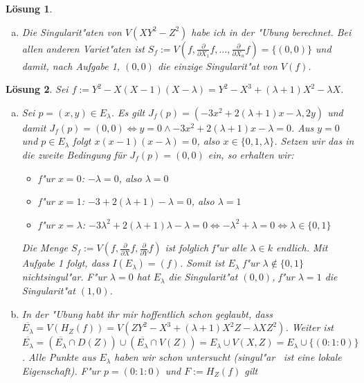 \documentclass[a4paper, 12pt, numbers=noendperiod, chapterprefix=true]{scrbook}
\theoremstyle{break}
\newtheorem{Loes}{L\"osung}
\theoremstyle{nonumberbreak}
\theoremstyle{nonumberplain}
\newcommand{\quot}[1]{\textrm{\glqq}{#1}\textrm{\grqq}}
\newcommand{\pder}[2][]{\frac{\partial #1}{\partial #2}}  %
\begin{document}
\begin{Loes}\begin{enumerate}[a)]\item
Die Singularit"aten von $V(XY^2 - Z^2)$ habe ich in der "Ubung berechnet. Bei allen anderen Variet"aten ist $S_f := V(f, \pder{X_1}{f}, \dots, \pder{X_n}{f}) = \{(0,0)\}$ und damit, nach Aufgabe 1, $(0,0)$ die einzige Singularit"at von $V(f)$.
\end{enumerate}\end{Loes}

\setcounter{Loes}{3}

\begin{Loes}
Sei $f:= Y^2 - X(X-1)(X-\lambda) = Y^2- X^3+(\lambda+1)X^2 - \lambda X$.\begin{enumerate}[a)]
\item
	Sei $p=(x,y) \in E_ {\lambda}$. Es gilt $J_f(p) = (-3x^2+2(\lambda+1)x-\lambda, 2y)$ und damit $J_f(p) = (0,0) \Leftrightarrow y = 0 \wedge -3x^2+2(\lambda +1)x - \lambda = 0$. Aus $y = 0$ und $p \in E_\lambda$ folgt $x(x-1)(x-\lambda) = 0$, also $x \in \{0,1,\lambda\}$. Setzen wir das in die zweite Bedingung für $J_f(p) = (0,0)$ ein, so erhalten wir:
	\begin{itemize}
		\item f"ur $x = 0$: $-\lambda = 0 $, also $\lambda = 0$
		\item f"ur $x = 1$: $-3+2(\lambda+1) - \lambda = 0$, also $\lambda = 1$
		\item f"ur $x = \lambda$: $-3 \lambda^2 + 2 (\lambda + 1) \lambda - \lambda = 0 \Leftrightarrow - \lambda^2 + \lambda =  0 \Leftrightarrow \lambda \in \{0,1\}$
	\end{itemize}
	Die Menge $S_f := V(f, \pder{X}{f}, \pder{Y}{f})$ ist folglich f"ur alle $\lambda \in k$ endlich. Mit Aufgabe 1 folgt, dass $I(E_\lambda) = (f)$. Somit ist $E_\lambda$ f"ur $\lambda \notin\{0,1\}$ nichtsingul"ar. F"ur $\lambda = 0$ hat $E_ \lambda$ die Singularit"at $(0,0)$, f"ur $\lambda = 1$ die Singularit"at $(1,0)$.
\item
	In der "Ubung habt ihr mir hoffentlich schon geglaubt, dass $\overline{E_\lambda} =  V (H_Z(f)) = V(ZY^2 - X^3 + (\lambda+1) X^2Z - \lambda X Z^2)$. Weiter ist $\overline{E_\lambda} = (\overline{E_\lambda} \cap D(Z) ) \cup (\overline{E_\lambda} \cap V(Z)) = E_\lambda \cup V(X,Z) = E_\lambda \cup \{(0:1:0)\}$. Alle Punkte aus $E_\lambda$ haben wir schon untersucht (\quot{singul"ar} \, ist eine lokale Eigenschaft). F"ur $p=(0:1:0)$ und $F := H_Z(f)$ gilt
	\begin{eqnarray*}

\end{eqnarray*}
\end{enumerate}
\end{Loes}
\end{document}
